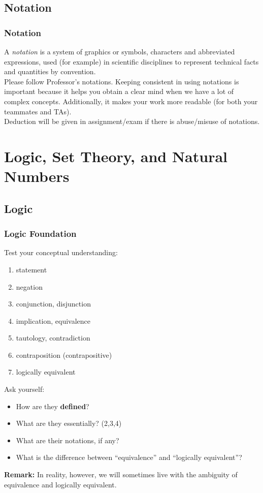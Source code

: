 \documentclass[10pt, t]{beamer}
\renewcommand{\emph}[1]{{\color{bladerunnerblue}\textsl{#1}}}
\newcommand{\nullspace}{~\\[15pt]}
\begin{document}
\subsection{Notation}
\begin{frame}
    \frametitle{Notation}
    A \emph{notation} is a system of graphics or symbols, characters and abbreviated expressions, used (for example) in scientific disciplines to represent technical facts and quantities by convention.
    \nullspace
    Please follow Professor's notations. Keeping consistent in using notations is important because it helps you obtain a clear mind when we have a lot of complex concepts. Additionally, it makes your work more readable (for both your teammates and TAs).
    \nullspace
    Deduction will be given in assignment/exam if there is abuse/misuse of notations.
\end{frame}

\section{Logic, Set Theory, and Natural Numbers}
\subsection{Logic}
\begin{frame}
    \frametitle{Logic Foundation}
    Test your conceptual understanding:
    \begin{enumerate}
        \item statement
        \item negation
        \item conjunction, disjunction
        \item implication, equivalence
        \item tautology, contradiction
        \item contraposition (contrapositive)
        \item logically equivalent
    \end{enumerate}
    Ask yourself:
    \begin{itemize}
        \item How are they \textbf{defined}?
        \item What are they essentially? (2,3,4)
        \item What are their notations, if any?
        \item What is the difference between ``equivalence'' and ``logically equivalent''?
    \end{itemize}
    \textbf{Remark:} In reality, however, we will sometimes live with the ambiguity of equivalence and logically equivalent. 
\end{frame}
\end{document}
